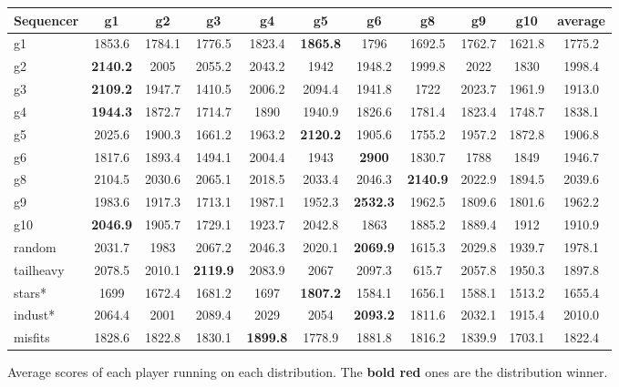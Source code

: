 \begin{figure}[ht]
\begin{center}
\begin{tabular}{| l | @{}c | @{}c | @{}c | @{}c | @{}c | @{}c | @{}c | @{}c | @{}c | @{}c |}
\hline
Sequencer & g1 & g2 & g3 & g4 & g5 & g6 & g8 & g9 & g10 & average \\
\hline
g1 & 1853.6 & 1784.1 & 1776.5 & 1823.4 & {\bf \color{red} 1865.8} & 1796 & 1692.5 & 1762.7 & 1621.8 & 1775.2 \\
\hline
g2 & {\bf \color{red} 2140.2} & 2005 & 2055.2 & 2043.2 & 1942 & 1948.2 & 1999.8 & 2022 & 1830 & 1998.4 \\
\hline
g3 & {\bf \color{red} 2109.2} & 1947.7 & 1410.5 & 2006.2 & 2094.4 & 1941.8 & 1722 & 2023.7 & 1961.9 & 1913.0 \\
\hline
g4 & {\bf \color{red} 1944.3} & 1872.7 & 1714.7 & 1890 & 1940.9 & 1826.6 & 1781.4 & 1823.4 & 1748.7 & 1838.1 \\
\hline
g5 & 2025.6 & 1900.3 & 1661.2 & 1963.2 & {\bf \color{red} 2120.2} & 1905.6 & 1755.2 & 1957.2 & 1872.8 & 1906.8 \\
\hline
g6 & 1817.6 & 1893.4 & 1494.1 & 2004.4 & 1943 & {\bf \color{red} 2900} & 1830.7 & 1788 & 1849 & 1946.7 \\
\hline
g8 & 2104.5 & 2030.6 & 2065.1 & 2018.5 & 2033.4 & 2046.3 & {\bf \color{red} 2140.9} & 2022.9 & 1894.5 & 2039.6 \\
\hline
g9 & 1983.6 & 1917.3 & 1713.1 & 1987.1 & 1952.3 & {\bf \color{red} 2532.3} & 1962.5 & 1809.6 & 1801.6 & 1962.2 \\
\hline
g10& {\bf \color{red} 2046.9} & 1905.7 & 1729.1 & 1923.7 & 2042.8 & 1863 & 1885.2 & 1889.4 & 1912 & 1910.9 \\
\hline
random &2031.7 & 1983 & 2067.2 & 2046.3 & 2020.1 & {\bf \color{red} 2069.9} & 1615.3 & 2029.8 & 1939.7 & 1978.1 \\
\hline
tailheavy &2078.5 & 2010.1 & {\bf \color{red} 2119.9} & 2083.9 & 2067 & 2097.3 & 615.7 & 2057.8 & 1950.3 & 1897.8 \\
\hline
stars* &1699 & 1672.4 & 1681.2 & 1697 & {\bf \color{red} 1807.2} & 1584.1 & 1656.1 & 1588.1 & 1513.2 & 1655.4 \\
\hline
indust* &2064.4 & 2001 & 2089.4 & 2029 & 2054 & {\bf \color{red} 2093.2} & 1811.6 & 2032.1 & 1915.4 & 2010.0 \\
\hline
misfits &1828.6 & 1822.8 & 1830.1 & {\bf \color{red} 1899.8} & 1778.9 & 1881.8 & 1816.2 & 1839.9 & 1703.1 & 1822.4 \\
\hline
\end{tabular}
\end{center}
\caption{Average scores of each player running on each distribution. \newline
The {\bf \color{red} bold red} ones are the distribution winner.}\label{fig:table}
\end{figure}

